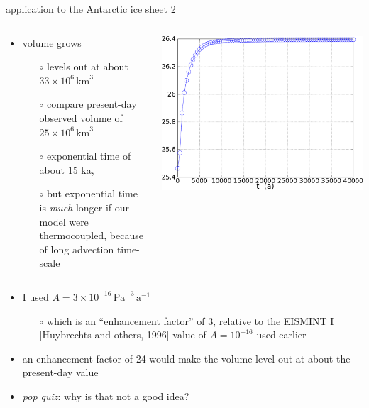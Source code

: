 \begin{frame}{application to the Antarctic ice sheet 2}

\begin{columns}
\begin{column}{0.6\textwidth}
\begin{itemize}
\item volume grows
  \begin{itemize}
  \item[$\circ$] levels out at about $33 \times 10^6\,\text{km}^3$
  \item[$\circ$] compare present-day observed volume of $25 \times 10^6\,\text{km}^3$
  \item[$\circ$] exponential time of about 15 ka,
  \item[$\circ$] but exponential time is \emph{much} longer if our model were thermocoupled, because of long advection time-scale  
  \end{itemize}
\end{itemize}
\end{column}
\begin{column}{0.45\textwidth}
\includegraphics[width=1.0\textwidth]{photos/antvol}
\end{column}
\end{columns}

\begin{itemize}
\item I used $A = 3\times 10^{-16}\,\text{Pa}^{-3}\,\text{a}^{-1}$ 
  \begin{itemize}
  \item[$\circ$] which is an ``enhancement factor'' of 3, \scriptsize relative to the EISMINT I [Huybrechts and others, 1996]\nocite{EISMINT96} value of $A=10^{-16}$ used earlier\small
  \end{itemize}
\item an enhancement factor of 24 would make the volume level out at about the present-day value
\item \emph{pop quiz}:  why is that not a good idea?
\end{itemize}
\end{frame}


